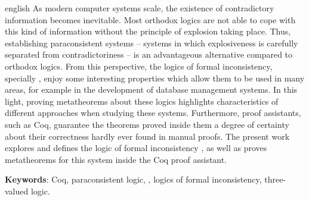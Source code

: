 \begin{resumo}[Abstract]
 \begin{otherlanguage*}{english}
    As modern computer systems scale, the existence of contradictory information becomes inevitable. Most orthodox logics are not able to cope with this kind of information without the principle of explosion taking place. Thus, establishing paraconsistent systems {--} systems in which explosiveness is carefully separated from contradictoriness {--} is an advantageous alternative compared to orthodox logics. From this perspective, the logics of formal inconsistency, specially \lfium{}, enjoy some interesting properties which allow them to be used in many areas, for example in the development of database management systems. In this light, proving metatheorems about these logics highlights characteristics of different approaches when studying these systems. Furthermore, proof assistants, such as Coq, guarantee the theorems proved inside them a degree of certainty about their correctness hardly ever found in manual proofs. The present work explores and defines the logic of formal inconsistency \lfium{}, as well as proves metatheorems for this system inside the Coq proof assistant.

   \textbf{Keywords}: Coq, paraconsistent logic, \lfium{}, logics of formal inconsistency, three-valued logic.
 \end{otherlanguage*}
\end{resumo}

